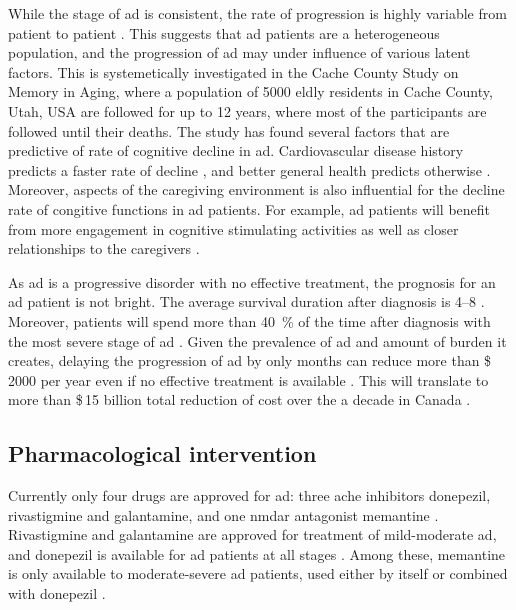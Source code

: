 While the stage of \gls{ad} is consistent, the rate of progression is highly variable from patient to patient \citep{komarova11, tschanz11}. This suggests that \gls{ad} patients are a heterogeneous population, and the progression of \gls{ad} may under influence of various latent factors. This is systemetically investigated in the Cache County Study on Memory in Aging, where a population of \num{5000} eldly residents in Cache County, Utah, USA are followed for up to \num{12} years, where most of the participants are followed until their deaths. The study has found several factors that are predictive of rate of cognitive decline in \gls{ad}. Cardiovascular disease history predicts a faster rate of decline \citep{mielke07}, and better general health predicts otherwise \citep{leoutsakos12}. Moreover, aspects of the caregiving environment is also influential for the decline rate of congitive functions in \gls{ad} patients. For example, \gls{ad} patients will benefit from more engagement in cognitive stimulating activities \citep{treiber11} as well as closer relationships to the caregivers \citep{norton09}.

As \gls{ad} is a progressive disorder with no effective treatment, the prognosis for an \gls{ad} patient is not bright. The average survival duration after diagnosis is \SIrange{4}{8}{\year} \citep{larson04, helzner08}. Moreover, patients will spend more than \SI{40}{\percent} of the time after diagnosis with the most severe stage of \gls{ad} \citep{arrighi10}. Given the prevalence of \gls{ad} and amount of burden it creates, delaying the progression of \gls{ad} by only months can reduce more than \$\,\num{2000} per year even if no effective treatment is available \citep{zhu06}. This will translate to more than \$\,15 billion total reduction of cost over the a decade in Canada \citep{adc10}.

\subsection{Pharmacological intervention \label{treatment}}
Currently only four drugs are approved for \gls{ad}: three \gls{ache} inhibitors donepezil, rivastigmine and galantamine, and one \gls{nmdar} antagonist memantine \citep{nelson15}. Rivastigmine and galantamine are approved for treatment of mild-moderate \gls{ad}, and donepezil is available for \gls{ad} patients at all stages \citep{bassil09, smith09}. Among these, memantine is only available to moderate-severe \gls{ad} patients, used either by itself or combined with donepezil \citep{nelson15}.

